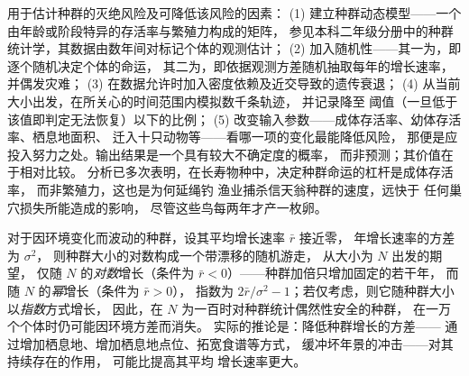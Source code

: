 \begin{method}[种群生存力分析]\label{met:b3:conservation-biology:pva}
用于估计种群的灭绝风险及可降低该风险的因素：
(1) 建立种群动态模型——一个由年龄或阶段特异的存活率与繁殖力构成的矩阵，
参见本科二年级分册中的种群统计学，其数据由数年间对标记个体的观测估计；
(2) 加入随机性——其一为，即逐个随机决定个体的命运，
其二为，即依据观测方差随机抽取每年的增长速率，
并偶发灾难；
(3) 在数据允许时加入密度依赖及近交导致的遗传衰退；
(4) 从当前大小出发，在所关心的时间范围内模拟数千条轨迹，
并记录降至
\emph{}阈值（一旦低于该值即判定无法恢复）以下的比例；
(5) 改变输入参数——成体存活率、幼体存活率、栖息地面积、
迁入十只动物等——看哪一项的变化最能降低风险，
那便是应投入努力之处。输出结果是一个具有较大不确定度的概率，
而非预测；其价值在于相对比较。
分析已多次表明，在长寿物种中，决定种群命运的杠杆是成体存活率，
而非繁殖力，这也是为何延绳钓
渔业捕杀信天翁种群的速度，远快于
任何巢穴损失所能造成的影响，
尽管这些鸟每两年才产一枚卵。
\end{method}

\begin{proposition}[灭绝时间]\label{prop:b3:conservation-biology:time}
对于因环境变化而波动的种群，设其平均增长速率 $\bar r$ 接近零，
年增长速率的方差为 $\sigma^{2}$，
则种群大小的对数构成一个带漂移的随机游走，
从大小为 $N$ 出发的期望，
仅随 $N$ 的\emph{对数}增长（条件为 $\bar r < 0$）——种群加倍只增加固定的若干年，
而随 $N$ 的\emph{幂}增长（条件为 $\bar r > 0$），
指数为 $2\bar r/\sigma^{2} - 1$；若仅考虑，则它随种群大小以\emph{指数}方式增长，
因此，在 $N$ 为一百时对种群统计偶然性安全的种群，
在一万个个体时仍可能因环境方差而消失。
实际的推论是：降低种群增长的方差——
通过增加栖息地、增加栖息地点位、拓宽食谱等方式，
缓冲坏年景的冲击——对其持续存在的作用，
可能比提高其平均
增长速率更大。
\end{proposition}
\admitted

